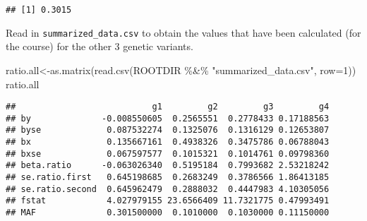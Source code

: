 \documentclass[
]{article}
\newenvironment{Shaded}{\begin{snugshade}}{\end{snugshade}}
\newcommand{\AttributeTok}[1]{\textcolor[rgb]{0.77,0.63,0.00}{#1}}
\newcommand{\DecValTok}[1]{\textcolor[rgb]{0.00,0.00,0.81}{#1}}
\newcommand{\FunctionTok}[1]{\textcolor[rgb]{0.00,0.00,0.00}{#1}}
\newcommand{\NormalTok}[1]{#1}
\newcommand{\OtherTok}[1]{\textcolor[rgb]{0.56,0.35,0.01}{#1}}
\newcommand{\SpecialCharTok}[1]{\textcolor[rgb]{0.00,0.00,0.00}{#1}}
\newcommand{\StringTok}[1]{\textcolor[rgb]{0.31,0.60,0.02}{#1}}
\begin{document}
\begin{verbatim}
## [1] 0.3015
\end{verbatim}

Read in \texttt{summarized\_data.csv} to obtain the values that have
been calculated (for the course) for the other 3 genetic variants.

\begin{Shaded}
\begin{Highlighting}[]
\NormalTok{ratio.all}\OtherTok{\textless{}{-}}\FunctionTok{as.matrix}\NormalTok{(}\FunctionTok{read.csv}\NormalTok{(ROOTDIR }\SpecialCharTok{\%\&\%} \StringTok{"summarized\_data.csv"}\NormalTok{, }\AttributeTok{row=}\DecValTok{1}\NormalTok{)) }
\NormalTok{ratio.all}
\end{Highlighting}
\end{Shaded}

\begin{verbatim}
##                           g1         g2         g3         g4
## by              -0.008550605  0.2565551  0.2778433 0.17188563
## byse             0.087532274  0.1325076  0.1316129 0.12653807
## bx               0.135667161  0.4938326  0.3475786 0.06788043
## bxse             0.067597577  0.1015321  0.1014761 0.09798360
## beta.ratio      -0.063026340  0.5195184  0.7993682 2.53218242
## se.ratio.first   0.645198685  0.2683249  0.3786566 1.86413185
## se.ratio.second  0.645962479  0.2888032  0.4447983 4.10305056
## fstat            4.027979155 23.6566409 11.7321775 0.47993491
## MAF              0.301500000  0.1010000  0.1030000 0.11150000
\end{verbatim}
\end{document}
